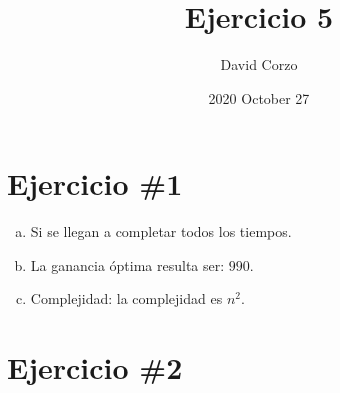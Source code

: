 \documentclass{article}
\title{Ejercicio 5 }
\date{2020 October 27} %
\author{David Corzo}
\begin{document}
\maketitle

\section{Ejercicio \#1}
\begin{enumerate}[(a)]
    \item Si se llegan a completar todos los tiempos.
    \item La ganancia óptima resulta ser: $990$.
    \item Complejidad: la complejidad es $n^2$.
\end{enumerate}

\section{Ejercicio \#2}


\end{document}
